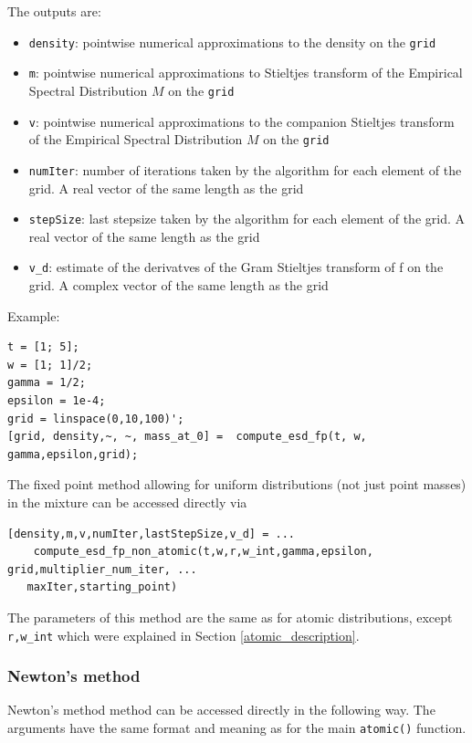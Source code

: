 \documentclass[english,11pt]{article} %
\begin{document}
The outputs are: 

\begin{itemize}
\item \verb+density+: pointwise numerical approximations to the density on the \verb+grid+
\item \verb+m+: pointwise numerical approximations to Stieltjes transform of the Empirical Spectral Distribution $M$ on the \verb+grid+
\item \verb+v+: pointwise numerical approximations to the companion Stieltjes transform of the Empirical Spectral Distribution $M$ on the \verb+grid+
\item \verb+numIter+: number of iterations taken by the algorithm for each element of the grid. A real vector of the same length as the grid
\item \verb+stepSize+: last stepsize taken by the algorithm for each element of
the grid. A real vector of the same length as the grid
\item \verb+v_d+: estimate of the derivatves of the Gram Stieltjes transform of f on the grid. A complex vector of the same length as the grid

\end{itemize}

Example:

\begin{verbatim}
t = [1; 5]; 
w = [1; 1]/2;
gamma = 1/2; 
epsilon = 1e-4;
grid = linspace(0,10,100)';
[grid, density,~, ~, mass_at_0] =  compute_esd_fp(t, w, gamma,epsilon,grid);
\end{verbatim}


The fixed point method allowing for uniform distributions (not just point masses) in the mixture can be accessed directly via

\begin{verbatim}
[density,m,v,numIter,lastStepSize,v_d] = ...
    compute_esd_fp_non_atomic(t,w,r,w_int,gamma,epsilon, grid,multiplier_num_iter, ...
   maxIter,starting_point)
\end{verbatim}

The parameters of this method are the same as for atomic distributions, except \verb+r,w_int+ which were explained in Section \ref{atomic_description}.


\subsubsection{Newton's method}

Newton's method method can be accessed directly in the following way. The arguments have the same format and meaning as for the main \verb+atomic()+ function. 
\end{document}
